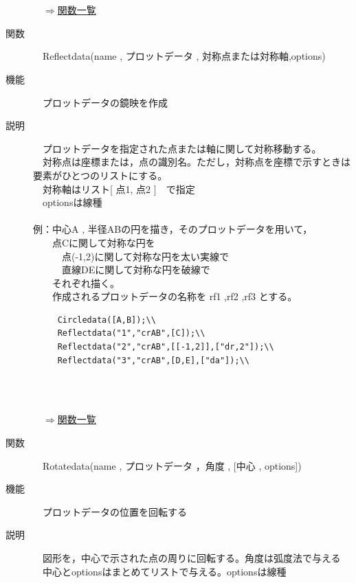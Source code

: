\documentclass[papersize,a4paper,12pt,uplatex]{jsarticle}
\begin{document}
\begin{description}
　　　　　　　　

　\\
\begin{flushright}　\hyperlink{functionlist}{$\Rightarrow$関数一覧}\end{flushright}

\hypertarget{reflextdata}{}
\item[関数]　Reflectdata(name , プロットデータ , 対称点または対称軸,options)
\item[機能]　プロットデータの鏡映を作成
\item[説明]　プロットデータを指定された点または軸に関して対称移動する。\\
　対称点は座標または，点の識別名。ただし，対称点を座標で示すときは要素がひとつのリストにする。\\
　対称軸はリスト[ 点1, 点2 ]　で指定\\
　optionsは線種\\
\\
例：中心A , 半径ABの円を描き，そのプロットデータを用いて，\\
　　点Cに関して対称な円を\\
　　　点(-1,2)に関して対称な円を太い実線で\\
　　　直線DEに関して対称な円を破線で\\
　　それぞれ描く。\\
　　作成されるプロットデータの名称を rf1 ,rf2 ,rf3 とする。
\begin{verbatim}
　　　Circledata([A,B]);\\
　　　Reflectdata("1","crAB",[C]);\\
　　　Reflectdata("2","crAB",[[-1,2]],["dr,2"]);\\
　　　Reflectdata("3","crAB",[D,E],["da"]);\\
\end{verbatim}
　\\
　　　

\begin{flushright}　\hyperlink{functionlist}{$\Rightarrow$関数一覧}\end{flushright}

\hypertarget{rotatedata}{}
\item[関数]　Rotatedata(name , プロットデータ ，角度 , [中心 , options])
\item[機能]　プロットデータの位置を回転する
\item[説明]　図形を，中心で示された点の周りに回転する。角度は弧度法で与える\\
　中心とoptionsはまとめてリストで与える。optionsは線種\\


\end{description}
\end{document}
